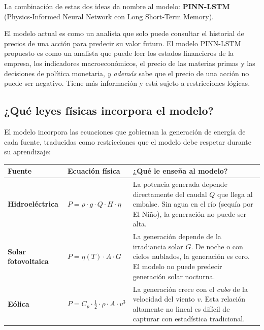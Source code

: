 \documentclass[11pt,a4paper]{article}
\begin{document}
La combinación de estas dos ideas da nombre al modelo: \textbf{PINN-LSTM} (Physics-Informed Neural Network con Long Short-Term Memory).

\begin{highlightbox}
El modelo actual es como un analista que solo puede consultar el historial de precios de una acción para predecir su valor futuro. El modelo PINN-LSTM propuesto es como un analista que puede leer los estados financieros de la empresa, los indicadores macroeconómicos, el precio de las materias primas y las decisiones de política monetaria, \textit{y además} sabe que el precio de una acción no puede ser negativo. Tiene más información y está sujeto a restricciones lógicas.
\end{highlightbox}

\subsection{¿Qué leyes físicas incorpora el modelo?}

El modelo incorpora las ecuaciones que gobiernan la generación de energía de cada fuente, traducidas como restricciones que el modelo debe respetar durante su aprendizaje:

\vspace{2mm}

\begin{center}
\small
\begin{tabular}{@{}p{2.8cm}p{4cm}p{7.5cm}@{}}
\toprule
\textbf{Fuente} & \textbf{Ecuación física} & \textbf{¿Qué le enseña al modelo?} \\
\midrule
\textbf{Hidroeléctrica} &
$P = \rho \cdot g \cdot Q \cdot H \cdot \eta$ &
La potencia generada depende directamente del caudal $Q$ que llega al embalse. Sin agua en el río (sequía por El Niño), la generación no puede ser alta. \\
\addlinespace
\textbf{Solar fotovoltaica} &
$P = \eta(T) \cdot A \cdot G$ &
La generación depende de la irradiancia solar $G$. De noche o con cielos nublados, la generación es cero. El modelo no puede predecir generación solar nocturna. \\
\addlinespace
\textbf{Eólica} &
$P = C_p \cdot \tfrac{1}{2} \cdot \rho \cdot A \cdot v^3$ &
La generación crece con el \textit{cubo} de la velocidad del viento $v$. Esta relación altamente no lineal es difícil de capturar con estadística tradicional. \\
\bottomrule
\end{tabular}
\end{center}
\end{document}
